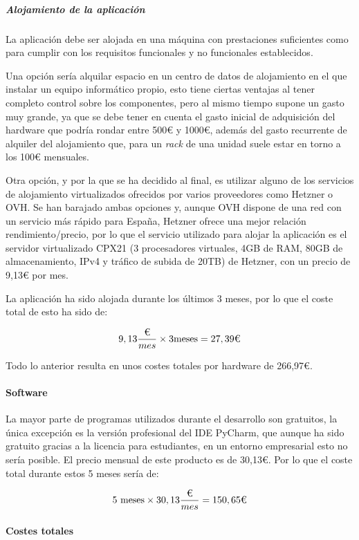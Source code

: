 \subparagraph{Alojamiento de la aplicación}

La aplicación debe ser alojada en una máquina con prestaciones suficientes como
para cumplir con los requisitos funcionales y no funcionales establecidos.

Una opción sería alquilar espacio en un centro de datos de alojamiento en el que
instalar un equipo informático propio, esto tiene ciertas ventajas al tener
completo control sobre los componentes, pero al mismo tiempo supone un gasto muy
grande, ya que se debe tener en cuenta el gasto inicial de adquisición del
hardware que podría rondar entre 500€ y 1000€, además del gasto recurrente de
alquiler del alojamiento que, para un \textit{rack} de una unidad suele estar en
torno a los 100€ mensuales.

Otra opción, y por la que se ha decidido al final, es utilizar alguno de los
servicios de alojamiento virtualizados ofrecidos por varios proveedores como
Hetzner o OVH. Se han barajado ambas opciones y, aunque OVH dispone de una red
con un servicio más rápido para España, Hetzner ofrece una mejor relación
rendimiento/precio, por lo que el servicio utilizado para alojar la aplicación
es el servidor virtualizado CPX21 (3 procesadores virtuales, 4GB de RAM, 80GB de
almacenamiento, IPv4 y tráfico de subida de 20TB) de Hetzner, con un precio de
9,13€ por mes.

La aplicación ha sido alojada durante los últimos 3 meses, por lo que el coste
total de esto ha sido de:

$$
9,13 \frac{\textup{€}}{mes} \times 3 \text{meses} = 27,39\textup{€}
$$

Todo lo anterior resulta en unos costes totales por hardware de 266,97€.

\paragraph{Software}

La mayor parte de programas utilizados durante el desarrollo son gratuitos, la
única excepción es la versión profesional del IDE PyCharm, que aunque ha sido
gratuito gracias a la licencia para estudiantes, en un entorno empresarial esto
no sería posible. El precio mensual de este producto es de 30,13€. Por lo que el
coste total durante estos 5 meses sería de:

$$
5\text{ meses} \times 30,13 \frac{\textup{€}}{mes} = 150,65\textup{€}
$$

\paragraph{Costes totales}

